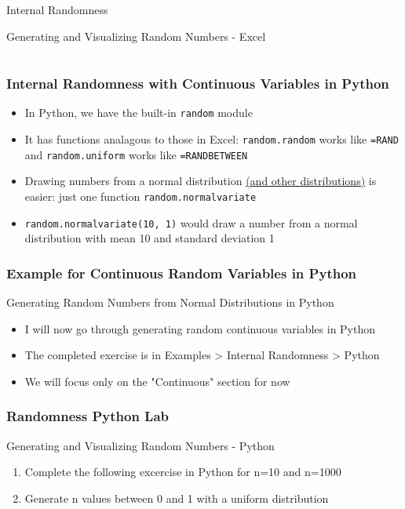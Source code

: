 \documentclass[handout, 11pt]{beamer}
\begin{document}
\begin{section}{Internal Randomness}
\begin{frame}
{\begin{block}{Generating and Visualizing Random Numbers - Excel}
\begin{tabular*}{\textwidth}{@{\extracolsep{\fill}}ccc}
\end{tabular*}
\end{block}
}
\label{labs:randomness-excel-lab-1}
\end{frame}
\begin{frame}
\frametitle{Internal Randomness with Continuous Variables in Python}
\begin{itemize}
\item In Python, we have the built-in
\texttt{random}
module
\vfill
\item It has functions analagous to those in Excel:
\texttt{random.random}
works like
\texttt{=RAND}
and
\texttt{random.uniform}
works like
\texttt{=RANDBETWEEN}
\vfill
\item Drawing numbers from a normal distribution
\textcolor{blue}{\underline{\href{https://docs.python.org/3.7/library/random.html\#real-valued-distributions}{(and other distributions)}}}
is easier: just one function
\texttt{random.normalvariate}
\vfill
\item \texttt{random.normalvariate(10, 1)}
would draw a number from a normal distribution with mean 10 and standard deviation 1
\end{itemize}
\end{frame}
\begin{frame}
\frametitle{Example for Continuous Random Variables in Python}
{
\begin{block}{Generating Random Numbers from Normal Distributions in Python}
\begin{itemize}
\item I will now go through generating random continuous variables in Python
\item The completed exercise is in Examples > Internal Randomness > Python 
\item We will focus only on the "Continuous" section for now
\end{itemize}
\end{block}
}
\end{frame}
\begin{frame}
\frametitle{Randomness Python Lab}
{
\begin{block}{Generating and Visualizing Random Numbers - Python}
\begin{enumerate}
\item Complete the following excercise in Python for n=10 and n=1000
\item Generate n values between 0 and 1 with a uniform distribution

\end{enumerate}
\end{block}}
\end{frame}
\end{section}
\end{document}
